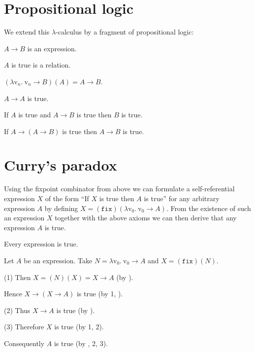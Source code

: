 \documentclass{stex}
\newcommand{\var}[1]{\mathrm{v}_{#1}}
\newcommand{\abs}[2]{\lambda\var{#1}.\ #2}
\newcommand{\app}[2]{(#1)(#2)}
\newcommand{\fix}{\mathtt{fix}}
\begin{document}
\section*{Propositional logic}

\noindent We extend this $\lambda$-calculus by a fragment of propositional logic:

\begin{fsignature*}[label=implication,title=Implication]
  $A \rightarrow B$ is an expression.
\end{fsignature*}

\begin{fsignature*}[label=truth]
  $A$ is true is a relation.
\end{fsignature*}

\begin{faxiom}[label=beta_reduction]
  $\app{\abs{n}{\var{n} \rightarrow B}}{A} = A \rightarrow B$.
\end{faxiom}

\begin{faxiom}[label=reflexivity]
  $A \rightarrow A$ is true.
\end{faxiom}

\begin{faxiom}[label=modus_ponens]
  If $A$ is true and $A \rightarrow B$ is true then $B$ is true.
\end{faxiom}

\begin{faxiom}[label=strengthening]
  If $A \rightarrow (A \rightarrow B)$ is true then $A \rightarrow B$ is true.
\end{faxiom}


\section*{Curry's paradox}

\noindent Using the fixpoint combinator from above we can formulate a self-referential expression $X$ of the form “If $X$ is true then $A$ is true” for any arbitrary expression $A$ by defining $X = \app{\fix}{\abs{0}{\var{0} \rightarrow A}}$.
From the existence of such an expression $X$ together with the above axioms we can then derive that any expression $A$ is true.

\begin{ftheorem*}[label=curry_paradox,title=Curry's paradox]
  Every expression is true.
\end{ftheorem*}
\begin{fproof}
  Let $A$ be an expression.
  Take $N = \abs{0}{\var{0} \rightarrow A}$ and $X = \app{\fix}{N}.$

  (1) Then $X = \app{N}{X} = X \rightarrow A$ (by ).

  Hence $X \rightarrow (X \rightarrow A)$ is true (by 1, ).

  (2) Thus $X \rightarrow A$ is true (by ).

  (3) Therefore $X$ is true (by 1, 2).

  Consequently $A$ is true (by , 2, 3).
\end{fproof}

\printbibliography
\end{document}
